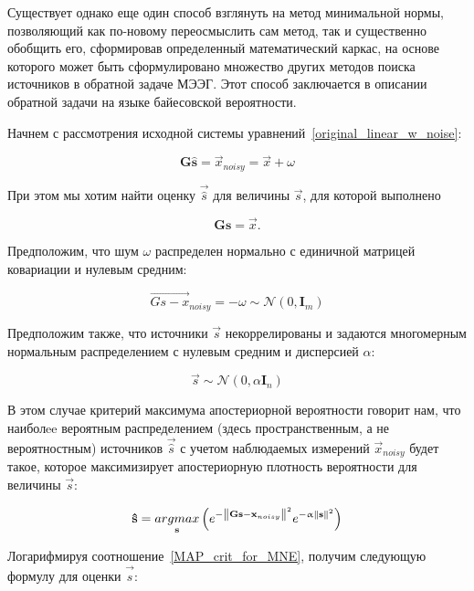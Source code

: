 Существует однако еще один способ взглянуть на метод минимальной нормы,
позволяющий как по-новому переосмыслить сам метод, так и существенно обобщить
его, сформировав определенный математический каркас, на основе которого
может быть сформулировано множество других методов поиска источников
в обратной задаче МЭЭГ. Этот способ заключается в описании обратной задачи
на языке байесовской вероятности.

Начнем с рассмотрения исходной системы уравнений~\ref{original_linear_w_noise}:

\begin{equation}
    \mathbf{G\hat{s}} = \vec{x}_{noisy} = \vec{x} + \omega
\end{equation}

При этом мы хотим найти оценку $\vec{\hat{s}}$ для величины $\vec{s}$,
для которой выполнено

\begin{equation}
    \mathbf{Gs} = \vec{x}.
\end{equation}

Предположим, что шум $\omega$ распределен нормально с единичной
матрицей ковариации и нулевым средним:

\begin{equation}
    \vec{Gs - x}_{noisy} = -\omega \sim \mathcal{N}(0, \mathbf{I}_m)
\end{equation}

Предположим также, что источники $\vec{s}$ некоррелированы и задаются
многомерным нормальным распределением с нулевым средним и дисперсией $\alpha$:

\begin{equation}
    \vec{s} \sim \mathcal{N}(0, \alpha\mathbf{I}_n)
\end{equation}

В этом случае критерий максимума апостериорной вероятности говорит нам, что
наиболee вероятным распределением (здесь пространственным, а не вероятностным)
источников $\vec{\hat{s}}$ с учетом наблюдаемых измерений
$\vec{x}_{noisy}$ будет такое, которое максимизирует апостериорную
плотность вероятности для величины $\vec{s}$:

\begin{equation}
    \mathbf{\hat{s}} =
    \underset{\mathbf{s}}{argmax} \left(
        e^{-\left\lVert\mathbf{Gs - x}_{noisy}\right\rVert^2} e^{-\upalpha\left\lVert\mathbf{s}\right\rVert^2}
    \right)
    \label{MAP_crit_for_MNE}
\end{equation}

Логарифмируя соотношение~\ref{MAP_crit_for_MNE}, получим следующую формулу
для оценки $\vec{\hat{s}}$:

